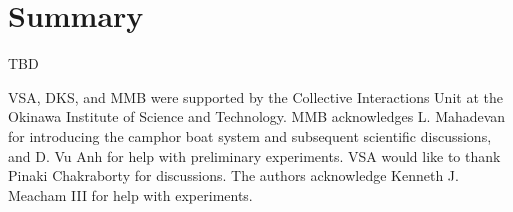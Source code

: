 \documentclass[journal=langd5, manuscript=article, layout=twocolumn]{achemso}
\begin{document}
\section{Summary}
\label{sec:summary}
TBD

\begin{acknowledgement}
VSA, DKS, and MMB were supported by the Collective Interactions Unit at the Okinawa Institute of Science and Technology. MMB acknowledges L. Mahadevan for introducing the camphor boat system and subsequent scientific discussions, and D. Vu Anh for help with preliminary experiments. VSA would like to thank Pinaki Chakraborty for discussions. The authors acknowledge Kenneth J. Meacham III for help with experiments.
\end{acknowledgement}






\end{document}
